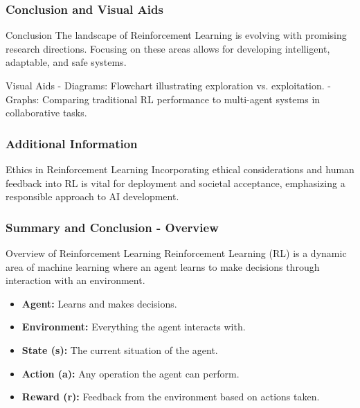 \documentclass[aspectratio=169]{beamer}
\begin{document}
\begin{frame}[fragile]
    \frametitle{Conclusion and Visual Aids}
    \begin{block}{Conclusion}
        The landscape of Reinforcement Learning is evolving with promising research directions. Focusing on these areas allows for developing intelligent, adaptable, and safe systems.
    \end{block}

    \begin{block}{Visual Aids}
        - Diagrams: Flowchart illustrating exploration vs. exploitation.
        - Graphs: Comparing traditional RL performance to multi-agent systems in collaborative tasks.
    \end{block}
\end{frame}

\begin{frame}[fragile]
    \frametitle{Additional Information}
    \begin{block}{Ethics in Reinforcement Learning}
        Incorporating ethical considerations and human feedback into RL is vital for deployment and societal acceptance, emphasizing a responsible approach to AI development.
    \end{block}
\end{frame}

\begin{frame}[fragile]
    \frametitle{Summary and Conclusion - Overview}
    \begin{block}{Overview of Reinforcement Learning}
        Reinforcement Learning (RL) is a dynamic area of machine learning where an agent learns to make decisions through interaction with an environment.
    \end{block}
    \begin{itemize}
        \item \textbf{Agent:} Learns and makes decisions.
        \item \textbf{Environment:} Everything the agent interacts with.
        \item \textbf{State (s):} The current situation of the agent.
        \item \textbf{Action (a):} Any operation the agent can perform.
        \item \textbf{Reward (r):} Feedback from the environment based on actions taken.
    \end{itemize}
\end{frame}
\end{document}
